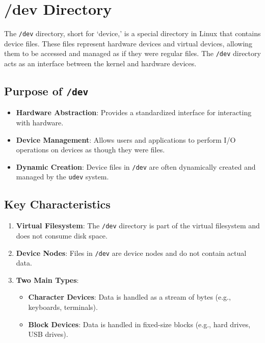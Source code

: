 \section{/dev Directory}

The \texttt{/dev} directory, short for `device,' is a special directory in Linux that contains device files. These files represent hardware devices and virtual devices, allowing them to be accessed and managed as if they were regular files. The \texttt{/dev} directory acts as an interface between the kernel and hardware devices.

\subsection*{Purpose of \texttt{/dev}}

\begin{itemize}
    \item \textbf{Hardware Abstraction}: Provides a standardized interface for interacting with hardware.
    \item \textbf{Device Management}: Allows users and applications to perform I/O operations on devices as though they were files.
    \item \textbf{Dynamic Creation}: Device files in \texttt{/dev} are often dynamically created and managed by the \texttt{udev} system.
\end{itemize}

\subsection*{Key Characteristics}

\begin{enumerate}
    \item \textbf{Virtual Filesystem}: The \texttt{/dev} directory is part of the virtual filesystem and does not consume disk space.
    \item \textbf{Device Nodes}: Files in \texttt{/dev} are device nodes and do not contain actual data.
    \item \textbf{Two Main Types}:
    \begin{itemize}
        \item \textbf{Character Devices}: Data is handled as a stream of bytes (e.g., keyboards, terminals).
        \item \textbf{Block Devices}: Data is handled in fixed-size blocks (e.g., hard drives, USB drives).
    \end{itemize}
\end{enumerate}

